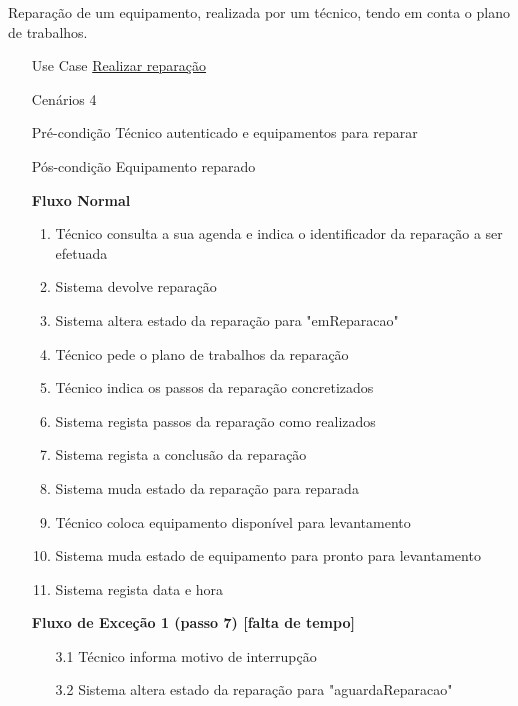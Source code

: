 \documentclass[../relatorio.tex]{subfiles}
\begin{document}
Reparação de um equipamento, realizada por um técnico, tendo em conta o plano de trabalhos.
\begin{itemize}
    \item[Use Case] {\underline{Realizar reparação}}
    \item[Cenários] {4}
    \item[Pré-condição] {Técnico autenticado e equipamentos para reparar}
    \item[Pós-condição] {Equipamento reparado}
          \begin{flushleft}
              \textbf{Fluxo Normal}
          \end{flushleft}
          \begin{enumerate}
              \item Técnico consulta a sua agenda e indica o identificador da reparação a ser efetuada
              \item Sistema devolve reparação
              \item Sistema altera estado da reparação para "emReparacao"
              \item Técnico pede o plano de trabalhos da reparação
              \item Técnico indica os passos da reparação concretizados
              \item Sistema regista passos da reparação como realizados
              \item Sistema regista a conclusão da reparação
              \item Sistema muda estado da reparação para reparada
              \item Técnico coloca equipamento disponível para levantamento
              \item Sistema muda estado de equipamento para pronto para levantamento        
              \item Sistema regista data e hora
          \end{enumerate}
          \begin{flushleft}
              \textbf{Fluxo de Exceção 1 (passo 7) [falta de tempo]}
          \end{flushleft}
          \begin{itemize}
              \item[3.1]{Técnico informa motivo de interrupção}
              \item[3.2]{Sistema altera estado da reparação para "aguardaReparacao"}
          \end{itemize}
          \begin{flushleft}

\end{flushleft}
\end{itemize}
\end{document}
